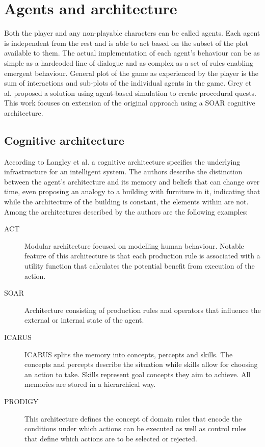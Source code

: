 \label{chapter:chapter1}

\section{Agents and architecture}

Both the player and any non-playable characters can be called agents.
Each agent is independent from the rest and is able to act based on the subset of the plot available to them.
The actual implementation of each agent's behaviour can be as simple as a hardcoded line of dialogue and as complex as a set of rules enabling emergent behaviour.
General plot of the game as experienced by the player is the sum of interactions and sub-plots of the individual agents in the game.
Grey et al.\cite{grey2011procedural} proposed a solution using agent-based simulation to create procedural quests.
This work focuses on extension of the original approach using a SOAR cognitive architecture\cite{rosenbloom1993soar}.

\subsection{Cognitive architecture}

According to Langley et al.\cite{langley2009cognitive} a cognitive architecture specifies the underlying infrastructure for an intelligent system.
The authors describe the distinction between the agent's architecture and its memory and beliefs that can change over time, even proposing an analogy to a building with furniture in it, indicating that while the architecture of the building is constant, the elements within are not.
Among the architectures described by the authors are the following examples:

\begin{description}
    \item[ACT] Modular architecture focused on modelling human behaviour. Notable feature of this architecture is that each production rule is associated with a utility function that calculates the potential benefit from execution of the action.
    \item[SOAR] Architecture consisting of production rules and operators that influence the external or internal state of the agent.
    \item[ICARUS] ICARUS splits the memory into concepts, percepts and skills. The concepts and percepts describe the situation while skills allow for choosing an action to take. Skills represent goal concepts they aim to achieve. All memories are stored in a hierarchical way.
    \item[PRODIGY] This architecture defines the concept of domain rules that encode the conditions under which actions can be executed as well as control rules that define which actions are to be selected or rejected.
\end{description}

